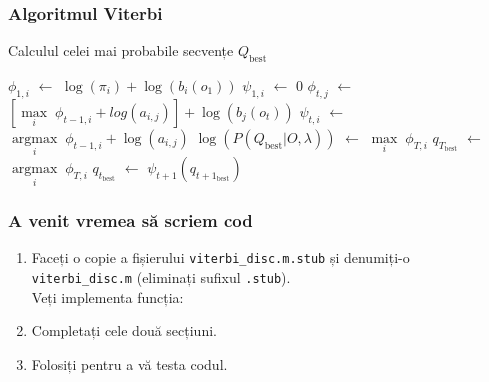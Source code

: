 \begin{frame}[fragile]
  \frametitle{Algoritmul Viterbi}
  \begin{algorithm}[H]
    \scriptsize
    \caption{Calculul celei mai probabile secvențe $Q_{\text{best}}$}
    \label{alg:viterbi}
     
    \begin{algorithmic}[2]
      \STATE $\phi_{1,i}$ $\leftarrow$ $\log(\pi_{i}) + \log(b_i(o_1))$
      \STATE $\psi_{1,i}$ $\leftarrow$ $0$
      \ENDFOR
      \STATE $\phi_{t,j}$ $\leftarrow$ $[\underset{i}{\operatorname{max}}\; \phi_{t-1,i} +
      log(a_{i,j})] + \log(b_{j}(o_{t}))$
      \STATE $\psi_{t,i}$ $\leftarrow$ $\underset{i}{\operatorname{argmax}}\; \phi_{t-1,i} +
      \log(a_{i,j})$
      \ENDFOR
      \ENDFOR
      \STATE $\log(P(Q_{\text{best}} \vert O, \lambda))$ $\leftarrow$ $\underset{i}{\operatorname{max}}\; \phi_{T,i}$
      \STATE $q_{T_{\text{best}}}$ $\leftarrow$ $\underset{i}{\operatorname{argmax}}\; \phi_{T,i}$
      \STATE $q_{t_{\text{best}}}$ $\leftarrow$ $\psi_{t+1}(q_{t+1_{\text{best}}})$
      \ENDFOR
    \end{algorithmic}
  \end{algorithm}
\end{frame}

\begin{frame}
  \frametitle{A venit vremea să scriem cod}
  \begin{enumerate}
  \item Faceți o copie a fișierului \texttt{viterbi\_disc.m.stub} 
    și denumiți-o \texttt{viterbi\_disc.m} (eliminați sufixul \texttt{.stub}).
    \\Veți implementa funcția:\\
    \pause
  \item Completați cele două secțiuni.%
    \vspace*{-1em}
    
\item Folosiți  pentru a vă testa codul.
\end{enumerate}
\end{frame}
